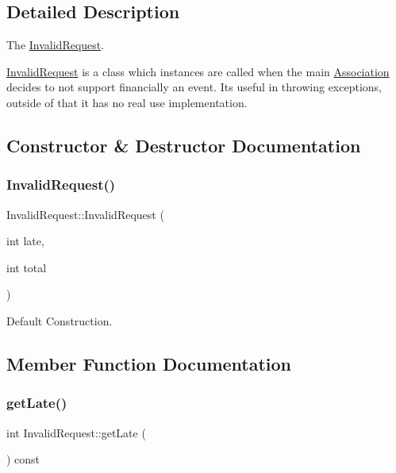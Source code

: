 \subsection{Detailed Description}
The \mbox{\hyperlink{classInvalidRequest}{Invalid\+Request}}. 

\mbox{\hyperlink{classInvalidRequest}{Invalid\+Request}} is a class which instances are called when the main \mbox{\hyperlink{classAssociation}{Association}} decides to not support financially an event. Its useful in throwing exceptions, outside of that it has no real use implementation. 

\subsection{Constructor \& Destructor Documentation}
\mbox{\label{classInvalidRequest_aff6963764c0246d2af135fc810cd98b1}} 
\subsubsection{\texorpdfstring{Invalid\+Request()}{InvalidRequest()}}
{\footnotesize\ttfamily Invalid\+Request\+::\+Invalid\+Request (\begin{DoxyParamCaption}\item[{int}]{late,  }\item[{int}]{total }\end{DoxyParamCaption})\hspace{0.3cm}{\ttfamily [inline]}}



Default Construction. 



\subsection{Member Function Documentation}
\mbox{\label{classInvalidRequest_a84e0946f534316dbc313e81adfd86b19}} 
\subsubsection{\texorpdfstring{get\+Late()}{getLate()}}
{\footnotesize\ttfamily int Invalid\+Request\+::get\+Late (\begin{DoxyParamCaption}{ }\end{DoxyParamCaption}) const\hspace{0.3cm}{\ttfamily [inline]}}




